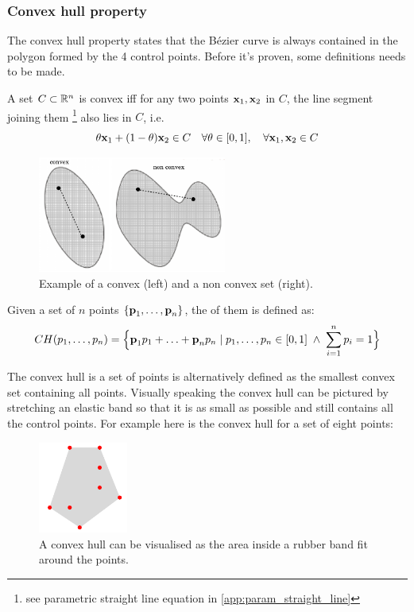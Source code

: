 \documentclass[a4paper]{article}
\begin{document}
\subsubsection{Convex hull property}

The convex hull property states that the B\'ezier curve is always contained in the polygon formed by the 4 control points. Before it's proven, some definitions needs to be made.
\begin{definition}[convex set]
    A set $C \subset \mathbb{R}^n$ is convex iff for any two points $\textbf{x}_1,\textbf{x}_2$ in $C$, the line segment joining them \footnote{see parametric straight line equation in \ref{app:param_straight_line}} also lies in $C$, i.e. 
\begin{equation}
\theta\textbf{x}_1 + (1-\theta)\textbf{x}_2 \in C \quad \forall \theta \in [0,1], \quad \forall \textbf{x}_1, \textbf{x}_2 \in C
\end{equation}
\end{definition}
\begin{figure}[H]
    \centering
    \includegraphics[height=3.8cm]{img/bezier/convex_non_convex.png}
    \caption{Example of a convex (left) and a non convex set (right).}%
\end{figure}

\begin{definition}
Given a set of $n$ points $\{\textbf{p}_1,\ldots,\textbf{p}_n\}$, the  of them is defined as:
\begin{equation}
CH(p_1,\ldots,p_n) = \Big\{\textbf{p}_1p_1 + \ldots + \textbf{p}_np_n \; | \; p_1,\ldots,p_n\in[0,1] \; \land \; \sum_{i=1}^n p_i = 1\Big\} 
\end{equation}
\end{definition}
The convex hull is a set of points is alternatively defined as the smallest convex set containing all points. Visually speaking the convex hull can be pictured by stretching an elastic band so that it is as small as possible and still contains all the control points. For example here is the convex hull for a set of eight points:
\begin{figure}[H]
    \centering
    \includegraphics[height=3cm]{img/bezier/convex_hull_8_points.png}
    \caption{A convex hull can be visualised as the area inside a rubber band fit around the points.}
\end{figure}
\end{document}
